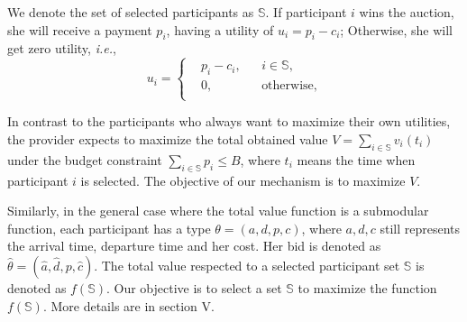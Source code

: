 \documentclass[10pt,journal,letterpaper,compsoc]{IEEEtran}
\newcommand{\ie}{{\em i.e.}}
\begin{document}

We denote the set of selected participants as $\mathbb{S}$. If participant $i$ wins the auction, she will receive a payment $p_i$, having a utility of $u_i=p_i-c_i$; Otherwise, she will get zero utility, \ie,
\begin{equation}\label{equ:utilityfunction}
u_i=\left\{
\begin{aligned}
&p_i-c_i, & & i\in \mathbb{S},\\
&0, & & \text{otherwise},\\
\end{aligned}
\right.
\end{equation}

In contrast to the participants who always want to maximize their own utilities, the provider expects to maximize the total obtained value $V=\sum_{i\in\mathbb{S}}v_i(t_i)$ under the budget constraint $\sum_{i\in\mathbb{S}}p_i \le B$, where $t_i$ means the time when participant $i$ is selected. The objective of our mechanism is to maximize $V$.

Similarly, in the general case where the total value function is a submodular function, each participant has a type $\theta = (a,d,p,c)$, where $a,d,c$ still represents the arrival time, departure time and her cost. Her bid is denoted as $\hat{\theta}=(\hat{a},\hat{d},p,\hat{c})$. The total value respected to a selected participant set $\mathbb{S}$ is denoted as $f(\mathbb{S})$. Our objective is to select a set $\mathbb{S}$ to maximize the function $f(\mathbb{S})$. More details are in section V.
\end{document}

